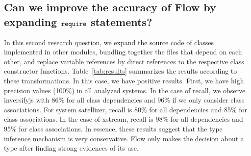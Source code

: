 \documentclass[review]{elsarticle}
\newcommand{\mcode}[1]{$\tt #1$}
\begin{document}

\begin{center}
	\noindent {}
\end{center}

\vspace{0.3cm}

\subsection {Can we improve the accuracy of Flow by expanding \mcode{require} statements?}
\label{sec:rq3}

In this second research question, we expand the source code of classes implemented in other modules, bundling together the files that depend on each other, and replace variable references by direct references to the respective class constructor functions. Table~\ref{tab:results} summarizes the results according to these transformations. In this case, we have positive results. First, we have high precision values (100\%) in all analyzed systems. In the case of recall, we observe {\sc inversifyjs} with 86\% for all class dependencies and 96\% if we only consider class associations. For system {\sc satellizer}, recall is 80\% for all dependencies and 85\% for class associations. In the case of {\sc xstream}, recall is 98\% for all dependencies and 95\% for class associations. In essence, these results suggest that the type inference mechanism is very conservative. Flow only makes the decision about a type after finding strong evidences of its use.

\end{document}
